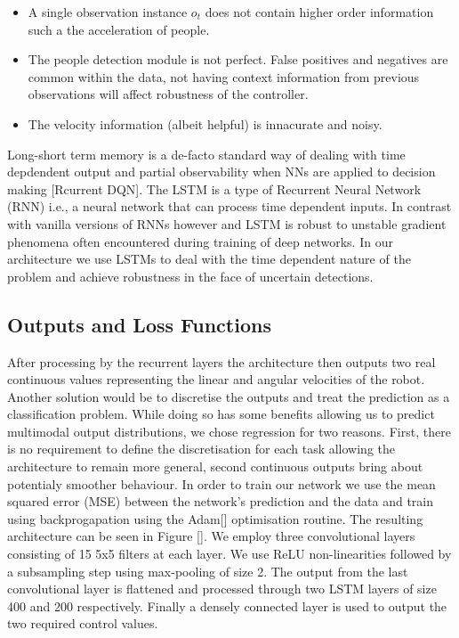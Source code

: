 \documentclass[letterpaper, 10 pt, conference]{ieeeconf}
\begin{document}
\begin{itemize}
\item A single observation instance $o_t$ does not contain higher order information such a the acceleration of people.
\item The people detection module is not perfect. False positives and negatives are common within the data, not having context information from previous observations will affect robustness of the controller.
\item The velocity information (albeit helpful) is innacurate and noisy.
\end{itemize}

Long-short term memory is a de-facto standard way of dealing with time depdendent output and partial observability when NNs are applied to decision making [Rcurrent DQN]. The LSTM is a type of Recurrent Neural Network (RNN) i.e., a neural network that can process time dependent inputs. In contrast with vanilla versions of RNNs however and LSTM is robust to unstable gradient phenomena often encountered during training of deep networks. In our architecture we use LSTMs to deal with the time dependent nature of the problem and achieve robustness in the face of uncertain detections.



\subsection{Outputs and Loss Functions}
After processing by the recurrent layers the architecture then outputs two real continuous values representing the linear and angular velocities of the robot. Another solution would be to discretise the outputs and treat the prediction as a classification problem. While doing so has some benefits allowing us to predict multimodal output distributions, we chose regression for two reasons. First, there is no requirement to define the discretisation for each task allowing the architecture to remain more general, second continuous outputs bring about potentialy smoother behaviour. In order to train our network we use the mean squared error (MSE) between the network's prediction and the data and train using backprogapation using the Adam[] optimisation routine. The resulting architecture can be seen in Figure []. We employ three convolutional layers consisting of 15 5x5 filters at each layer. We use ReLU non-linearities followed by a subsampling step using max-pooling of size 2. The output from the last convolutional layer is flattened and processed through two LSTM layers of size 400 and 200 respectively. Finally a densely connected layer is used to output the two required control values. 
\end{document}
